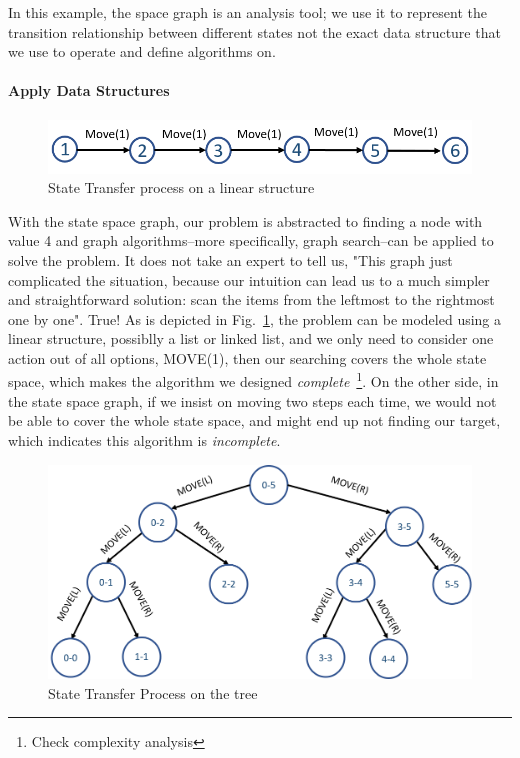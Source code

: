 \documentclass[../main.tex]{subfiles}
\begin{document}
In this example, the space graph is an analysis tool; we use it to represent the transition relationship between different states not the exact data structure that we use to operate and define algorithms on. 

\paragraph{Apply Data Structures}
\begin{figure}[!ht]
    \centering
    \includegraphics[width=0.9\columnwidth]{fig/problem_formulation_1.png}
    \caption{State Transfer process on a linear structure }
    \label{fig:problem_formulation_1}
\end{figure}

With the state space graph, our problem is abstracted to finding a node with value 4 and graph algorithms--more specifically, graph search--can be applied to solve the problem. It does not take an expert to tell us, "This graph just complicated the situation, because our intuition can lead us to a much simpler and straightforward solution: scan the items from the leftmost to the rightmost one by one". True! As is depicted in Fig.~\ref{fig:problem_formulation_1}, the problem can be modeled using a linear structure, possiblly a list or linked list, and we only need to consider one action out of all options, MOVE(1), then our searching covers the whole state space, which makes the algorithm we designed \textit{complete}~\footnote{Check complexity analysis}. On the other side, in the state space graph, if we insist on moving two steps each time, we would not be able to cover the whole state space, and might end up not finding our target, which indicates this algorithm is \textit{incomplete}.
\begin{figure}[!ht]
    \centering
    \includegraphics[width=0.7\columnwidth]{fig/problem_formulation_3.png}
    \caption{State Transfer Process on the tree}
    \label{fig:problem_formulation_2}
\end{figure}
\end{document}
